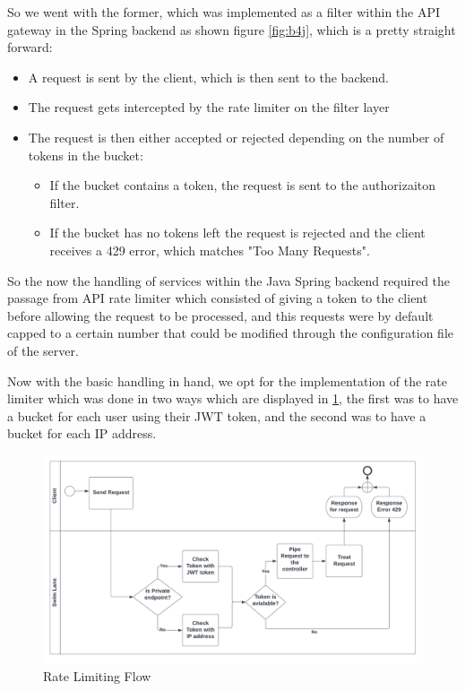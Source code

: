 So we went with the former, which was implemented as a filter within the API gateway
in the Spring backend as shown figure \ref{fig:b4j}, which is a pretty straight forward:
\begin{itemize}
    \item A request is sent by the client, which is then sent to the backend.
    \item The request gets intercepted by the rate limiter on the filter layer
    \item The request is then either accepted or rejected depending on
        the number of tokens in the bucket:
        \begin {itemize}
            \item If the bucket contains a token, the request is sent to the authorizaiton
                filter.
            \item If the bucket has no tokens left the request is rejected and the client
                receives a 429 error, which matches "Too Many Requests".
        \end {itemize}
\end{itemize}

So the now the handling of services within the Java Spring backend required the passage
from API rate limiter which consisted of giving a token to the client before allowing
the request to be processed, and this requests were by default capped to a certain number
that could be modified through the configuration file of the server.

Now with the basic handling in hand, we opt for the implementation of the rate limiter
which was done in two ways which are displayed in \ref{fig:ratelimiting_flow}, the first
was to have a bucket for each user using their JWT token, and the second was to have a bucket
for each IP address.

\begin{figure}[!ht]
    \centering
    \includegraphics[width=\textwidth]{images/ratelimitingflow.png}
    \caption{\footnotesize{Rate Limiting Flow}}
    \label{fig:ratelimiting_flow}
\end{figure}

